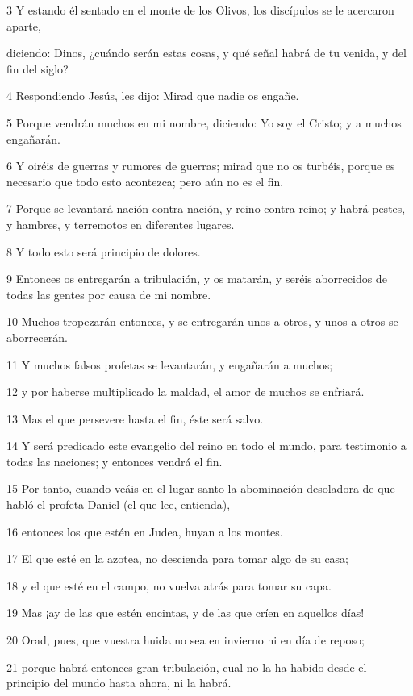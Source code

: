 \par 3 Y estando él sentado en el monte de los Olivos, los discípulos se le acercaron aparte,
\par diciendo: Dinos, ¿cuándo serán estas cosas, y qué señal habrá de tu venida, y del fin del siglo?
\par 4 Respondiendo Jesús, les dijo: Mirad que nadie os engañe.
\par 5 Porque vendrán muchos en mi nombre, diciendo: Yo soy el Cristo; y a muchos engañarán.
\par 6 Y oiréis de guerras y rumores de guerras; mirad que no os turbéis, porque es necesario que todo esto acontezca; pero aún no es el fin.
\par 7 Porque se levantará nación contra nación, y reino contra reino; y habrá pestes, y hambres, y terremotos en diferentes lugares.
\par 8 Y todo esto será principio de dolores.
\par 9 Entonces os entregarán a tribulación, y os matarán, y seréis aborrecidos de todas las gentes por causa de mi nombre.
\par 10 Muchos tropezarán entonces, y se entregarán unos a otros, y unos a otros se aborrecerán.
\par 11 Y muchos falsos profetas se levantarán, y engañarán a muchos;
\par 12 y por haberse multiplicado la maldad, el amor de muchos se enfriará.
\par 13 Mas el que persevere hasta el fin, éste será salvo.
\par 14 Y será predicado este evangelio del reino en todo el mundo, para testimonio a todas las naciones; y entonces vendrá el fin.
\par 15 Por tanto, cuando veáis en el lugar santo la abominación desoladora de que habló el profeta Daniel (el que lee, entienda),
\par 16 entonces los que estén en Judea, huyan a los montes.
\par 17 El que esté en la azotea, no descienda para tomar algo de su casa;
\par 18 y el que esté en el campo, no vuelva atrás para tomar su capa.
\par 19 Mas ¡ay de las que estén encintas, y de las que críen en aquellos días!
\par 20 Orad, pues, que vuestra huida no sea en invierno ni en día de reposo;
\par 21 porque habrá entonces gran tribulación, cual no la ha habido desde el principio del mundo hasta ahora, ni la habrá.
